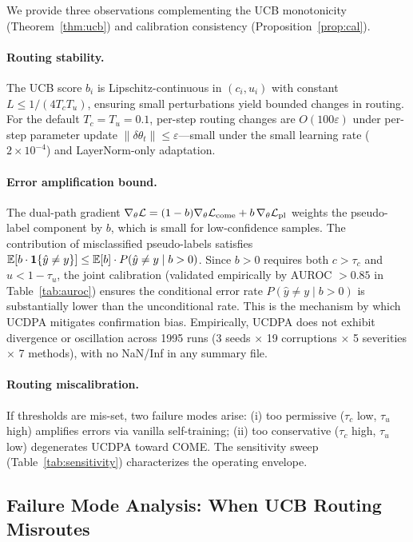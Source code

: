 We provide three observations complementing the UCB monotonicity (Theorem~\ref{thm:ucb}) and calibration consistency (Proposition~\ref{prop:cal}).

\paragraph{Routing stability.}
The UCB score $b_i$ is Lipschitz-continuous in $(c_i, u_i)$ with constant $L \le 1/(4 T_c T_u)$, ensuring small perturbations yield bounded changes in routing. For the default $T_c=T_u=0.1$, per-step routing changes are $O(100\varepsilon)$ under per-step parameter update $\|\delta\theta_t\| \le \varepsilon$---small under the small learning rate ($2\times10^{-4}$) and LayerNorm-only adaptation.

\paragraph{Error amplification bound.}
The dual-path gradient $\nabla_\theta \mathcal{L} = (1-b)\nabla_\theta \mathcal{L}_\mathrm{come} + b\,\nabla_\theta \mathcal{L}_\mathrm{pl}$ weights the pseudo-label component by $b$, which is small for low-confidence samples. The contribution of misclassified pseudo-labels satisfies $\mathbb{E}[b \cdot \mathbf{1}\{\hat{y} \neq y\}] \le \mathbb{E}[b]\cdot P(\hat{y}\neq y \mid b>0)$. Since $b>0$ requires both $c > \tau_c$ and $u < 1-\tau_u$, the joint calibration (validated empirically by AUROC $>0.85$ in Table~\ref{tab:auroc}) ensures the conditional error rate $P(\hat{y}\neq y \mid b>0)$ is substantially lower than the unconditional rate. This is the mechanism by which UCDPA mitigates confirmation bias. Empirically, UCDPA does not exhibit divergence or oscillation across 1995 runs (3 seeds $\times$ 19 corruptions $\times$ 5 severities $\times$ 7 methods), with no NaN/Inf in any summary file.

\paragraph{Routing miscalibration.}
If thresholds are mis-set, two failure modes arise: (i) too permissive ($\tau_c$ low, $\tau_u$ high) amplifies errors via vanilla self-training; (ii) too conservative ($\tau_c$ high, $\tau_u$ low) degenerates UCDPA toward COME. The sensitivity sweep (Table~\ref{tab:sensitivity}) characterizes the operating envelope.

\subsection{Failure Mode Analysis: When UCB Routing Misroutes}
\label{sec:disc:failure-modes}

